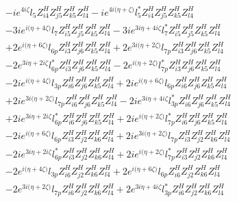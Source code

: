 \begin{align}
 &-i e^{4 i \zeta } l_5 Z_{{i 4}}^{H} Z_{{j 5}}^{H} Z_{{k 5}}^{H} Z_{{l 4}}^{H} -i e^{4 i \Big(\eta +\zeta \Big)} l_5^* Z_{{i 4}}^{H} Z_{{j 5}}^{H} Z_{{k 5}}^{H} Z_{{l 4}}^{H} \nonumber \\ 
 &-3 i e^{i \Big(\eta +4 \zeta \Big)} l_7 Z_{{i 5}}^{H} Z_{{j 5}}^{H} Z_{{k 5}}^{H} Z_{{l 4}}^{H} -3 i e^{3 i \eta +4 i \zeta } l_7^* Z_{{i 5}}^{H} Z_{{j 5}}^{H} Z_{{k 5}}^{H} Z_{{l 4}}^{H} \nonumber \\ 
 &+2 e^{i \Big(\eta +6 \zeta \Big)} l_{6p} Z_{{i 3}}^{H} Z_{{j 6}}^{H} Z_{{k 5}}^{H} Z_{{l 4}}^{H} +2 e^{3 i \Big(\eta +2 \zeta \Big)} l_{7p} Z_{{i 3}}^{H} Z_{{j 6}}^{H} Z_{{k 5}}^{H} Z_{{l 4}}^{H} \nonumber \\ 
 &-2 e^{3 i \eta +2 i \zeta } l_{6p}^* Z_{{i 3}}^{H} Z_{{j 6}}^{H} Z_{{k 5}}^{H} Z_{{l 4}}^{H} -2 e^{i \Big(\eta +2 \zeta \Big)} l_{7p}^* Z_{{i 3}}^{H} Z_{{j 6}}^{H} Z_{{k 5}}^{H} Z_{{l 4}}^{H} \nonumber \\ 
 &-2 i e^{i \Big(\eta +4 \zeta \Big)} l_{3p} Z_{{i 6}}^{H} Z_{{j 6}}^{H} Z_{{k 5}}^{H} Z_{{l 4}}^{H} +2 i e^{i \Big(\eta +6 \zeta \Big)} l_{6p} Z_{{i 6}}^{H} Z_{{j 6}}^{H} Z_{{k 5}}^{H} Z_{{l 4}}^{H} \nonumber \\ 
 &+2 i e^{3 i \Big(\eta +2 \zeta \Big)} l_{7p} Z_{{i 6}}^{H} Z_{{j 6}}^{H} Z_{{k 5}}^{H} Z_{{l 4}}^{H} -2 i e^{3 i \eta +4 i \zeta } l_{3p}^* Z_{{i 6}}^{H} Z_{{j 6}}^{H} Z_{{k 5}}^{H} Z_{{l 4}}^{H} \nonumber \\ 
 &+2 i e^{3 i \eta +2 i \zeta } l_{6p}^* Z_{{i 6}}^{H} Z_{{j 6}}^{H} Z_{{k 5}}^{H} Z_{{l 4}}^{H} +2 i e^{i \Big(\eta +2 \zeta \Big)} l_{7p}^* Z_{{i 6}}^{H} Z_{{j 6}}^{H} Z_{{k 5}}^{H} Z_{{l 4}}^{H} \nonumber \\ 
 &-2 i e^{i \Big(\eta +6 \zeta \Big)} l_{6p} Z_{{i 3}}^{H} Z_{{j 2}}^{H} Z_{{k 6}}^{H} Z_{{l 4}}^{H} +2 i e^{3 i \Big(\eta +2 \zeta \Big)} l_{7p} Z_{{i 3}}^{H} Z_{{j 2}}^{H} Z_{{k 6}}^{H} Z_{{l 4}}^{H} \nonumber \\ 
 &-2 i e^{3 i \eta +2 i \zeta } l_{6p}^* Z_{{i 3}}^{H} Z_{{j 2}}^{H} Z_{{k 6}}^{H} Z_{{l 4}}^{H} +2 i e^{i \Big(\eta +2 \zeta \Big)} l_{7p}^* Z_{{i 3}}^{H} Z_{{j 2}}^{H} Z_{{k 6}}^{H} Z_{{l 4}}^{H} \nonumber \\ 
 &-2 e^{i \Big(\eta +4 \zeta \Big)} l_{3p} Z_{{i 6}}^{H} Z_{{j 2}}^{H} Z_{{k 6}}^{H} Z_{{l 4}}^{H} +2 e^{i \Big(\eta +6 \zeta \Big)} l_{6p} Z_{{i 6}}^{H} Z_{{j 2}}^{H} Z_{{k 6}}^{H} Z_{{l 4}}^{H} \nonumber \\ 
 &-2 e^{3 i \Big(\eta +2 \zeta \Big)} l_{7p} Z_{{i 6}}^{H} Z_{{j 2}}^{H} Z_{{k 6}}^{H} Z_{{l 4}}^{H} +2 e^{3 i \eta +4 i \zeta } l_{3p}^* Z_{{i 6}}^{H} Z_{{j 2}}^{H} Z_{{k 6}}^{H} Z_{{l 4}}^{H} \nonumber \\ 

\end{align}
